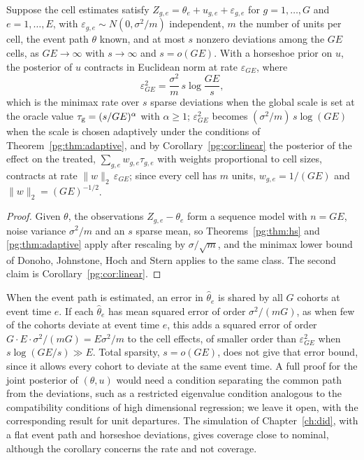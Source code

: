 \begin{corollary}\label{pg:cor:did}
Suppose the cell estimates satisfy $Z_{g,e} = \theta_e + u_{g,e} + \varepsilon_{g,e}$ for $g = 1,\dots,G$ and $e = 1,\dots,E$, with $\varepsilon_{g,e}\sim N(0, \sigma^2/m)$ independent, $m$ the number of units per cell, the event path $\theta$ known, and at most $s$ nonzero deviations among the $GE$ cells, as $GE\to\infty$ with $s\to\infty$ and $s = o(GE)$. With a horseshoe prior on $u$, the posterior of $u$ contracts in Euclidean norm at rate $\varepsilon_{GE}$, where
\[
\varepsilon_{GE}^2 = \frac{\sigma^2}{m}\,s\log\frac{GE}{s},
\]
which is the minimax rate over $s$ sparse deviations when the global scale is set at the oracle value $\tau_{\mathrm{g}} = (s/GE)^\alpha$ with $\alpha\ge1$; $\varepsilon_{GE}^2$ becomes $(\sigma^2/m)\,s\log(GE)$ when the scale is chosen adaptively under the conditions of Theorem~\ref{pg:thm:adaptive}, and by Corollary~\ref{pg:cor:linear} the posterior of the effect on the treated, $\sum_{g,e}w_{g,e}\tau_{g,e}$ with weights proportional to cell sizes, contracts at rate $\lVert w\rVert_2\,\varepsilon_{GE}$; since every cell has $m$ units, $w_{g,e} = 1/(GE)$ and $\lVert w\rVert_2 = (GE)^{-1/2}$.
\end{corollary}
\begin{proof}
Given $\theta$, the observations $Z_{g,e}-\theta_e$ form a sequence model with $n = GE$, noise variance $\sigma^2/m$ and an $s$ sparse mean, so Theorems~\ref{pg:thm:hs} and \ref{pg:thm:adaptive} apply after rescaling by $\sigma/\sqrt m$, and the minimax lower bound of Donoho, Johnstone, Hoch and Stern applies to the same class. The second claim is Corollary~\ref{pg:cor:linear}.
\end{proof}

When the event path is estimated, an error in $\hat\theta_e$ is shared by all $G$ cohorts at event time $e$. If each $\hat\theta_e$ has mean squared error of order $\sigma^2/(mG)$, as when few of the cohorts deviate at event time $e$, this adds a squared error of order $G\cdot E\cdot\sigma^2/(mG) = E\sigma^2/m$ to the cell effects, of smaller order than $\varepsilon_{GE}^2$ when $s\log(GE/s)\gg E$. Total sparsity, $s=o(GE)$, does not give that error bound, since it allows every cohort to deviate at the same event time. A full proof for the joint posterior of $(\theta,u)$ would need a condition separating the common path from the deviations, such as a restricted eigenvalue condition analogous to the compatibility conditions of high dimensional regression; we leave it open, with the corresponding result for unit departures. The simulation of Chapter~\ref{ch:did}, with a flat event path and horseshoe deviations, gives coverage close to nominal, although the corollary concerns the rate and not coverage.

